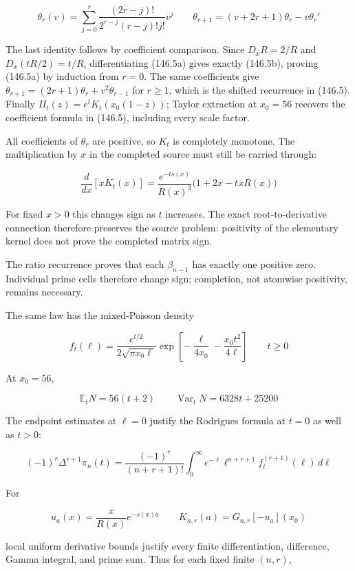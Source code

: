 \documentclass[
  11pt,
]{book}
\begin{document}
\[
\theta_r(v)=\sum_{j=0}^r
\frac{(2r-j)!}{2^{r-j}(r-j)!j!}v^j
\qquad
\theta_{r+1}=(v+2r+1)\theta_r-v\theta_r'
\tag{146.5b}
\]

The last identity follows by coefficient comparison. Since \(D_xR=2/R\)
and \(D_x(tR/2)=t/R\), differentiating (146.5a) gives exactly (146.5b),
proving (146.5a) by induction from \(r=0\). The same coefficients give
\(\theta_{r+1}=(2r+1)\theta_r+v^2\theta_{r-1}\) for \(r\ge1\), which is
the shifted recurrence in (146.5). Finally
\(\Pi_t(z)=e^tK_t(x_0(1-z))\); Taylor extraction at \(x_0=56\) recovers
the coefficient formula in (146.5), including every scale factor.

All coefficients of \(\theta_r\) are positive, so \(K_t\) is completely
monotone. The multiplication by \(x\) in the completed source must still
be carried through:

\[
\frac{d}{dx}[xK_t(x)]
=\frac{e^{-t s(x)}}{R(x)^3}
\bigl(1+2x-txR(x)\bigr)
\tag{146.5c}
\]

For fixed \(x>0\) this changes sign as \(t\) increases. The exact
root-to-derivative connection therefore preserves the source problem:
positivity of the elementary kernel does not prove the completed matrix
sign.

The ratio recurrence proves that each \(\beta_{n-1}\) has exactly one
positive zero. Individual prime cells therefore change sign; completion,
not atomwise positivity, remains necessary.

The same law has the mixed-Poisson density

\[
\boxed{
f_t(\ell)=
\frac{e^{t/2}}{2\sqrt{\pi x_0\ell}}
\exp\!\left[-\frac{\ell}{4x_0}
-\frac{x_0t^2}{4\ell}\right]
\qquad t\ge0}
\tag{146.6}
\]

At \(x_0=56\),

\[
\mathbb E_tN=56(t+2)
\qquad
\operatorname{Var}_tN=6328t+25200
\tag{146.7}
\]

The endpoint estimates at \(\ell=0\) justify the Rodrigues formula at
\(t=0\) as well as \(t>0\):

\[
(-1)^r\Delta^{r+1}\pi_n(t)
=\frac{(-1)^r}{(n+r+1)!}
\int_0^\infty e^{-\ell}\ell^{n+r+1}
f_t^{(r+1)}(\ell)\,d\ell
\tag{146.8}
\]

For

\[
u_a(x)=\frac{x}{R(x)}e^{-s(x)a}
\qquad
K_{n,r}(a)=G_{n,r}[-u_a](x_0)
\]

local uniform derivative bounds justify every finite differentiation,
difference, Gamma integral, and prime sum. Thus for each fixed finite
\((n,r)\),
\end{document}
